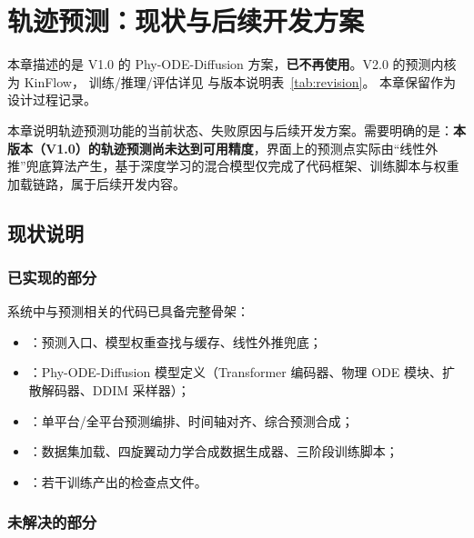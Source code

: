 \section{轨迹预测：现状与后续开发方案}
\label{sec:prediction_future}

\begin{notebox}[V2.0 修订说明]
本章描述的是 V1.0 的 Phy-ODE-Diffusion 方案，\textbf{已不再使用}。V2.0 的预测内核为 KinFlow，
训练/推理/评估详见  与版本说明表~\ref{tab:revision}。
本章保留作为设计过程记录。
\end{notebox}

本章说明轨迹预测功能的当前状态、失败原因与后续开发方案。需要明确的是：\textbf{本版本（V1.0）的轨迹预测尚未达到可用精度}，界面上的预测点实际由“线性外推”兜底算法产生，基于深度学习的混合模型仅完成了代码框架、训练脚本与权重加载链路，属于后续开发内容。

\subsection{现状说明}

\subsubsection{已实现的部分}

系统中与预测相关的代码已具备完整骨架：

\begin{itemize}
  \item {}：预测入口、模型权重查找与缓存、线性外推兜底；
  \item {}：Phy-ODE-Diffusion 模型定义（Transformer 编码器、物理 ODE 模块、扩散解码器、DDIM 采样器）；
  \item {}：单平台/全平台预测编排、时间轴对齐、综合预测合成；
  \item {}：数据集加载、四旋翼动力学合成数据生成器、三阶段训练脚本；
  \item {}：若干训练产出的检查点文件。
\end{itemize}

\subsubsection{未解决的部分}

